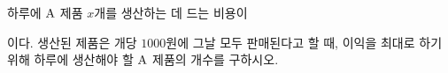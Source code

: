 하루에 $\mathrm{A}$ 제품 $x$개를 생산하는 데 드는 비용이 \par\smallskip{}\par\smallskip\noindent 이다. 생산된 제품은 개당 $1000$원에 그날 모두 판매된다고 할 때, 이익을 최대로 하기 위해 하루에 생산해야 할 $\mathrm{A}$ 제품의 개수를 구하시오.
